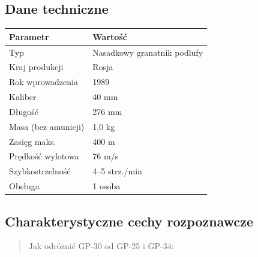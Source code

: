 \documentclass[12pt,oneside]{book}
\begin{document}
\subsection{Dane techniczne}\label{dane-techniczne-95}

\begin{longtable}[]{@{}ll@{}}
\toprule\noalign{}
Parametr & Wartość \\
\midrule\noalign{}
\endhead
\bottomrule\noalign{}
\endlastfoot
Typ & Nasadkowy granatnik podlufy \\
Kraj produkcji & Rosja \\
Rok wprowadzenia & 1989 \\
Kaliber & 40 mm \\
Długość & 276 mm \\
Masa (bez amunicji) & 1,0 kg \\
Zasięg maks. & 400 m \\
Prędkość wylotowa & 76 m/s \\
Szybkostrzelność & 4--5 strz./min \\
Obsługa & 1 osoba \\
\end{longtable}

\subsection{Charakterystyczne cechy
rozpoznawcze}\label{charakterystyczne-cechy-rozpoznawcze-95}

\begin{quote}
Jak odróżnić GP-30 od GP-25 i GP-34:
\end{quote}
\end{document}
